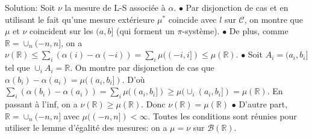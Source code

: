 \documentclass{report}
\begin{document}
Solution: Soit $\nu$ la mesure de L-S associée à $\alpha$. \newline $\bullet$ Par disjonction de cas et en utilisant le fait qu'une mesure extérieure $\mu^*$ coincide avec $l$ sur $\mathcal C$,  on montre que $\mu$ et $\nu$ coincident sur les $(a,b]$ (qui forment un $\pi$-système). \newline $\bullet$ De plus, comme $\mathbb R = \cup_n (-n,n]$, on a $\nu(\mathbb R) \leq \sum_i (\alpha(i)-\alpha(-i)) = \sum_i \mu((-i,i])\leq \mu(\mathbb R)$. \newline $\bullet$ Soit $A_i = (a_i,b_i]$ tel que $\cup_i A_i = \mathbb R$. On montre par disjonction de cas que $\alpha(b_i)-\alpha(a_i)=  \mu((a_i,b_i])$. D'où $\sum_i (\alpha(b_i)-\alpha(a_i)) = \sum_i \mu((a_i,b_i]) \geq \mu(\cup_i(a_i,b_i]) = \mu(\mathbb R)$. En passant à l'inf, on a $\nu(\mathbb R)\geq \mu(\mathbb R)$. \newline Donc $\nu(\mathbb R)= \mu(\mathbb R)$ \newline $\bullet$ D'autre part, $\mathbb R = \cup_n (-n,n]$ avec $\mu((-n,n])< \infty $. \newline \newline
Toutes les conditions sont réunies pour utiliser le lemme d'égalité des mesures: on a $\mu = \nu$ sur $\mathcal B(\mathbb R)$.

\subsection{}  \\\\
\end{document}
